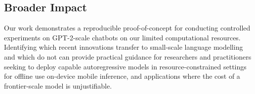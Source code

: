 \subsection{Broader Impact}

Our work demonstrates a reproducible proof-of-concept for conducting controlled experiments on GPT-2-scale chatbots on our limited computational resources.
Identifying which recent innovations transfer to small-scale language modelling and which do not can provide practical guidance for researchers and practitioners seeking to deploy capable autoregressive models in resource-constrained settings for offline use on-device mobile
inference, and applications where the cost of a frontier-scale model is unjustifiable.
